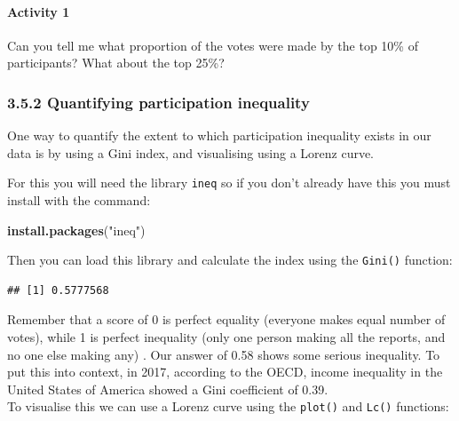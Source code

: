 \documentclass[
]{article}
\newenvironment{Shaded}{\begin{snugshade}}{\end{snugshade}}
\newcommand{\KeywordTok}[1]{\textcolor[rgb]{0.13,0.29,0.53}{\textbf{#1}}}
\newcommand{\NormalTok}[1]{#1}
\newcommand{\OperatorTok}[1]{\textcolor[rgb]{0.81,0.36,0.00}{\textbf{#1}}}
\newcommand{\StringTok}[1]{\textcolor[rgb]{0.31,0.60,0.02}{#1}}
\begin{document}
\hypertarget{activity-1}{%
\paragraph{Activity 1}\label{activity-1}}

Can you tell me what proportion of the votes were made by the top 10\%
of participants? What about the top 25\%?

\hypertarget{quantifying-participation-inequality}{%
\subsubsection{3.5.2 Quantifying participation
inequality}\label{quantifying-participation-inequality}}

One way to quantify the extent to which participation inequality exists
in our data is by using a Gini index, and visualising using a Lorenz
curve.

For this you will need the library \texttt{ineq} so if you don't already
have this you must install with the command:

\begin{Shaded}
\begin{Highlighting}[]
\KeywordTok{install.packages}\NormalTok{(}\StringTok{"ineq"}\NormalTok{) }
\end{Highlighting}
\end{Shaded}

Then you can load this library and calculate the index using the
\texttt{Gini()} function:

\begin{Shaded}
\end{Shaded}

\begin{verbatim}
## [1] 0.5777568
\end{verbatim}

Remember that a score of 0 is perfect equality (everyone makes equal
number of votes), while 1 is perfect inequality (only one person making
all the reports, and no one else making any) . Our answer of 0.58 shows
some serious inequality. To put this into context, in 2017, according to
the OECD, income inequality in the United States of America showed a
Gini coefficient of 0.39.\\
To visualise this we can use a Lorenz curve using the \texttt{plot()}
and \texttt{Lc()} functions:
\end{document}

